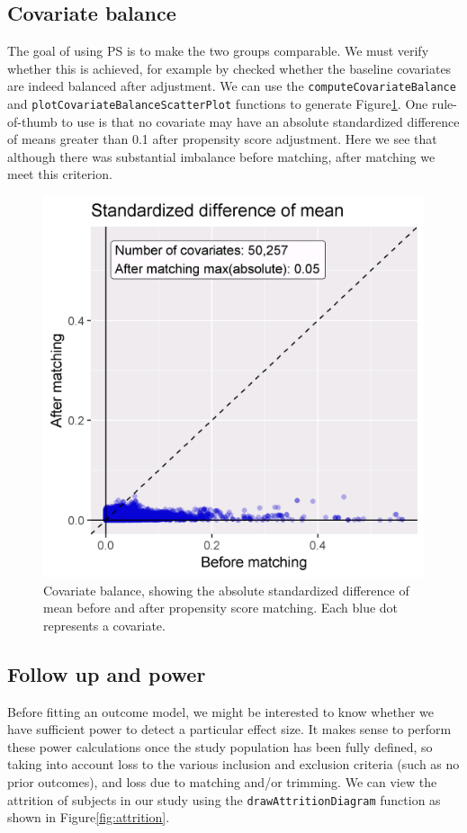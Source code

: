 \documentclass[]{book}
\begin{document}
\subsection{Covariate balance}\label{covariate-balance}

The goal of using PS is to make the two groups comparable. We must
verify whether this is achieved, for example by checked whether the
baseline covariates are indeed balanced after adjustment. We can use the
\texttt{computeCovariateBalance} and
\texttt{plotCovariateBalanceScatterPlot} functions to generate
Figure\ref{fig:balance}. One rule-of-thumb to use is that no covariate
may have an absolute standardized difference of means greater than 0.1
after propensity score adjustment. Here we see that although there was
substantial imbalance before matching, after matching we meet this
criterion.

\begin{figure}

{\centering \includegraphics[width=0.7\linewidth]{images/PopulationLevelEstimation/balance} 

}

\caption{Covariate balance, showing the absolute standardized difference of mean before and after propensity score matching. Each blue dot represents a covariate.}\label{fig:balance}
\end{figure}

\subsection{Follow up and power}\label{follow-up-and-power}

Before fitting an outcome model, we might be interested to know whether
we have sufficient power to detect a particular effect size. It makes
sense to perform these power calculations once the study population has
been fully defined, so taking into account loss to the various inclusion
and exclusion criteria (such as no prior outcomes), and loss due to
matching and/or trimming. We can view the attrition of subjects in our
study using the \texttt{drawAttritionDiagram} function as shown in
Figure\ref{fig:attrition}.
\end{document}
